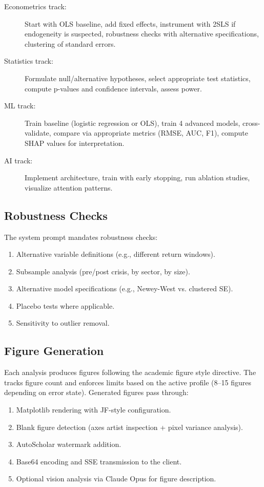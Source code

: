 \begin{description}
  \item[Econometrics track:] Start with OLS baseline, add fixed effects, instrument with 2SLS if endogeneity is suspected, robustness checks with alternative specifications, clustering of standard errors.
  \item[Statistics track:] Formulate null/alternative hypotheses, select appropriate test statistics, compute p-values and confidence intervals, assess power.
  \item[ML track:] Train baseline (logistic regression or OLS), train 4 advanced models, cross-validate, compare via appropriate metrics (RMSE, AUC, F1), compute SHAP values for interpretation.
  \item[AI track:] Implement architecture, train with early stopping, run ablation studies, visualize attention patterns.
\end{description}

\subsection{Robustness Checks}

The system prompt mandates robustness checks:

\begin{enumerate}
  \item Alternative variable definitions (e.g., different return windows).
  \item Subsample analysis (pre/post crisis, by sector, by size).
  \item Alternative model specifications (e.g., Newey-West vs. clustered SE).
  \item Placebo tests where applicable.
  \item Sensitivity to outlier removal.
\end{enumerate}

\subsection{Figure Generation}

Each analysis produces figures following the academic figure style directive.
The \governor tracks figure count and enforces limits based on the active profile (8--15 figures depending on error state).
Generated figures pass through:

\begin{enumerate}
  \item Matplotlib rendering with JF-style configuration.
  \item Blank figure detection (axes artist inspection + pixel variance analysis).
  \item AutoScholar watermark addition.
  \item Base64 encoding and SSE transmission to the client.
  \item Optional vision analysis via Claude Opus for figure description.
\end{enumerate}

